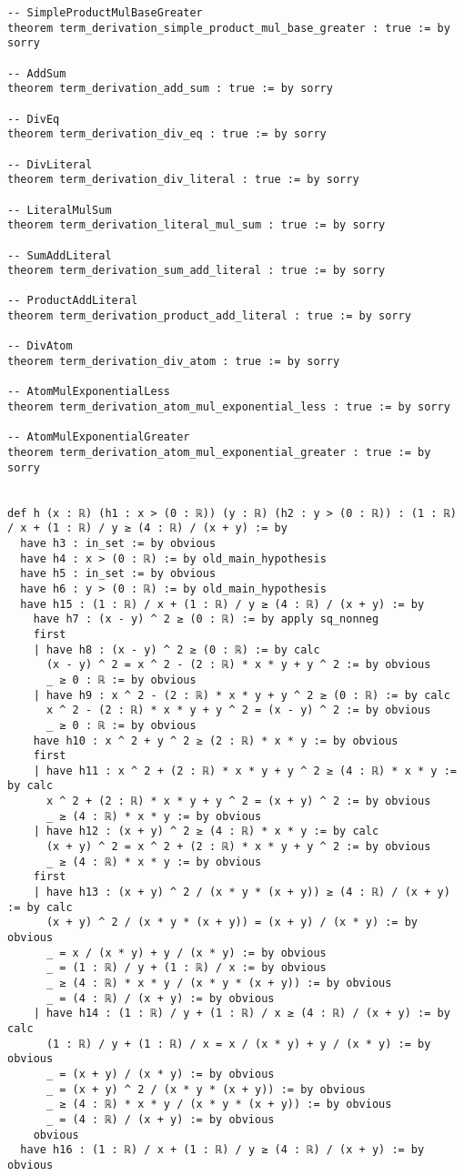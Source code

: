 \documentclass{article}
\begin{document}
\begin{tcolorbox}[colback=white!10, width=\linewidth]
\begin{lstlisting}[language=Lean4]
-- SimpleProductMulBaseGreater
theorem term_derivation_simple_product_mul_base_greater : true := by sorry

-- AddSum
theorem term_derivation_add_sum : true := by sorry

-- DivEq
theorem term_derivation_div_eq : true := by sorry

-- DivLiteral
theorem term_derivation_div_literal : true := by sorry

-- LiteralMulSum
theorem term_derivation_literal_mul_sum : true := by sorry

-- SumAddLiteral
theorem term_derivation_sum_add_literal : true := by sorry

-- ProductAddLiteral
theorem term_derivation_product_add_literal : true := by sorry

-- DivAtom
theorem term_derivation_div_atom : true := by sorry

-- AtomMulExponentialLess
theorem term_derivation_atom_mul_exponential_less : true := by sorry

-- AtomMulExponentialGreater
theorem term_derivation_atom_mul_exponential_greater : true := by sorry


def h (x : ℝ) (h1 : x > (0 : ℝ)) (y : ℝ) (h2 : y > (0 : ℝ)) : (1 : ℝ) / x + (1 : ℝ) / y ≥ (4 : ℝ) / (x + y) := by
  have h3 : in_set := by obvious
  have h4 : x > (0 : ℝ) := by old_main_hypothesis
  have h5 : in_set := by obvious
  have h6 : y > (0 : ℝ) := by old_main_hypothesis
  have h15 : (1 : ℝ) / x + (1 : ℝ) / y ≥ (4 : ℝ) / (x + y) := by
    have h7 : (x - y) ^ 2 ≥ (0 : ℝ) := by apply sq_nonneg
    first
    | have h8 : (x - y) ^ 2 ≥ (0 : ℝ) := by calc
      (x - y) ^ 2 = x ^ 2 - (2 : ℝ) * x * y + y ^ 2 := by obvious
      _ ≥ 0 : ℝ := by obvious
    | have h9 : x ^ 2 - (2 : ℝ) * x * y + y ^ 2 ≥ (0 : ℝ) := by calc
      x ^ 2 - (2 : ℝ) * x * y + y ^ 2 = (x - y) ^ 2 := by obvious
      _ ≥ 0 : ℝ := by obvious
    have h10 : x ^ 2 + y ^ 2 ≥ (2 : ℝ) * x * y := by obvious
    first
    | have h11 : x ^ 2 + (2 : ℝ) * x * y + y ^ 2 ≥ (4 : ℝ) * x * y := by calc
      x ^ 2 + (2 : ℝ) * x * y + y ^ 2 = (x + y) ^ 2 := by obvious
      _ ≥ (4 : ℝ) * x * y := by obvious
    | have h12 : (x + y) ^ 2 ≥ (4 : ℝ) * x * y := by calc
      (x + y) ^ 2 = x ^ 2 + (2 : ℝ) * x * y + y ^ 2 := by obvious
      _ ≥ (4 : ℝ) * x * y := by obvious
    first
    | have h13 : (x + y) ^ 2 / (x * y * (x + y)) ≥ (4 : ℝ) / (x + y) := by calc
      (x + y) ^ 2 / (x * y * (x + y)) = (x + y) / (x * y) := by obvious
      _ = x / (x * y) + y / (x * y) := by obvious
      _ = (1 : ℝ) / y + (1 : ℝ) / x := by obvious
      _ ≥ (4 : ℝ) * x * y / (x * y * (x + y)) := by obvious
      _ = (4 : ℝ) / (x + y) := by obvious
    | have h14 : (1 : ℝ) / y + (1 : ℝ) / x ≥ (4 : ℝ) / (x + y) := by calc
      (1 : ℝ) / y + (1 : ℝ) / x = x / (x * y) + y / (x * y) := by obvious
      _ = (x + y) / (x * y) := by obvious
      _ = (x + y) ^ 2 / (x * y * (x + y)) := by obvious
      _ ≥ (4 : ℝ) * x * y / (x * y * (x + y)) := by obvious
      _ = (4 : ℝ) / (x + y) := by obvious
    obvious
  have h16 : (1 : ℝ) / x + (1 : ℝ) / y ≥ (4 : ℝ) / (x + y) := by obvious


\end{lstlisting}
\end{tcolorbox}
\end{document}

